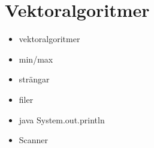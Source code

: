 \chapter{Vektoralgoritmer}
\begin{itemize}[nosep]
\item vektoralgoritmer
\item min/max
\item strängar
\item filer
\item java System.out.println
\item Scanner\end{itemize}